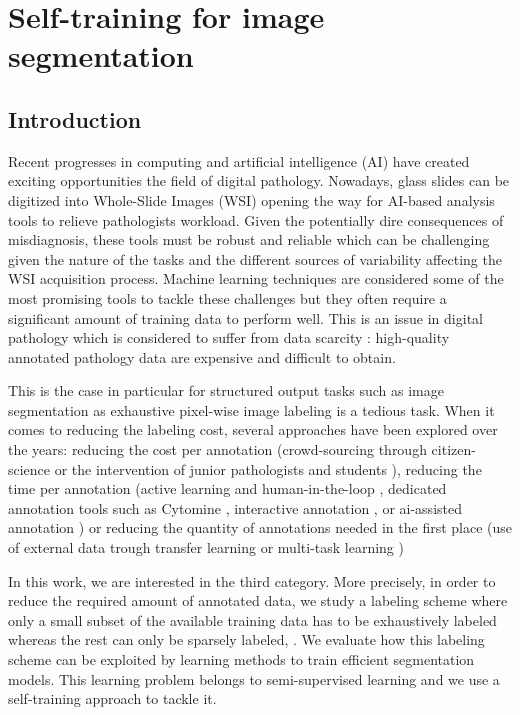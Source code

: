 \chapter{Self-training for image segmentation}
\label{chap:strain}

\section{Introduction}
\label{sec:intro}

Recent progresses in computing and artificial intelligence (AI) have created exciting opportunities the field of digital pathology. Nowadays, glass slides can be digitized into Whole-Slide Images (WSI) opening the way for AI-based analysis tools to relieve pathologists workload. Given the potentially dire consequences of misdiagnosis, these tools must be robust and reliable which can be challenging given the nature of the tasks and the different sources of variability affecting the WSI acquisition process. Machine learning techniques are considered some of the most promising tools to tackle these challenges but they often require a significant amount of training data to perform well. This is an issue in digital pathology which is considered to suffer from data scarcity \cite{tizhoosh2018artificial, litjens2017survey}: high-quality annotated pathology data are expensive and difficult to obtain. 

This is the case in particular for structured output tasks such as image segmentation as exhaustive pixel-wise image labeling is a tedious task. When it comes to reducing the labeling cost, several approaches have been explored over the years: reducing the cost per annotation (\eg crowd-sourcing through citizen-science \cite{peplow2016citizen} or the intervention of junior pathologists and students \cite{amgad2021nucls}), reducing the time per annotation (\eg active learning and human-in-the-loop \cite{chai2020human}, dedicated annotation tools such as Cytomine \cite{maree2016collaborative}, interactive annotation \cite{berg2019}, or ai-assisted annotation \cite{amgad2021nucls, graham2021conic, aubreville2021mitosis}) or reducing the quantity of annotations needed in the first place (\eg use of external data trough transfer learning \cite{mormont2018comparison} or multi-task learning \cite{mormont2020multi})

In this work, we are interested in the third category. More precisely, in order to reduce the required amount of annotated data, we study a labeling scheme where only a small subset of the available training data has to be exhaustively labeled whereas the rest can only be sparsely labeled, .  We evaluate how this labeling scheme can be exploited by learning methods to train efficient segmentation models. This learning problem belongs to semi-supervised learning and we use a self-training approach to tackle it.


